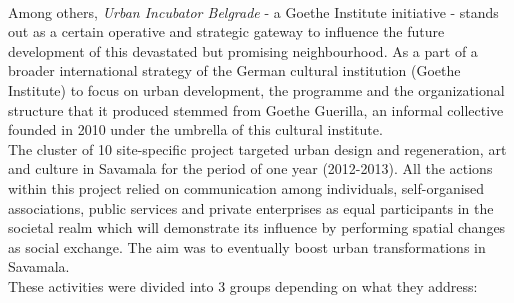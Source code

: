 \documentclass[11pt]{report}
\begin{document}
\\
Among others, \textit{Urban Incubator Belgrade} - a Goethe Institute initiative - stands out as a certain operative and strategic gateway to influence the future development of this devastated but promising neighbourhood.
As a part of a broader international strategy of the German cultural institution (Goethe Institute) to focus on urban development, the programme and the organizational structure that it produced stemmed from Goethe Guerilla, an informal collective founded in 2010 under the umbrella of this cultural institute.
\\
The cluster of 10 site-specific project targeted urban design and regeneration, art and culture in Savamala for the period of one year (2012-2013).
All the actions within this project relied on communication among individuals, self-organised associations, public services and private enterprises as equal participants in the societal realm which will demonstrate its influence by performing spatial changes as social exchange. The aim was to eventually boost urban transformations in Savamala.
\\
These activities were divided into 3 groups depending on what they address:
\end{document}
